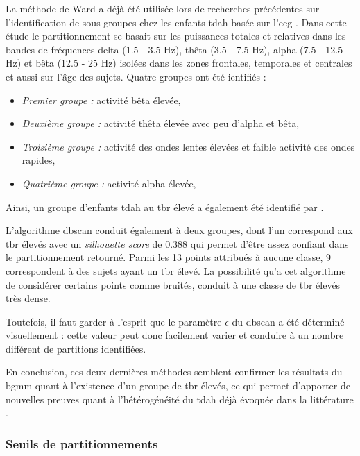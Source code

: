 La méthode de Ward a déjà été utilisée lors de recherches 
précédentes sur l'identification de sous-groupes chez les enfants \gls{tdah} basée sur l'\gls{eeg} \citep{Clarke2011}. Dans cette étude le partitionnement
se basait sur les puissances totales et relatives dans les bandes de fréquences delta (1.5 - 3.5 Hz), thêta (3.5 - 7.5 Hz), alpha (7.5 - 12.5 Hz) et bêta 
(12.5 - 25 Hz) isolées dans les zones frontales, temporales et centrales et aussi sur l'âge des sujets. Quatre groupes ont été ientifiés : 
\begin{itemize}
\item \emph{Premier groupe :} activité bêta élevée,
\item \emph{Deuxième groupe :} activité thêta élevée avec peu d'alpha et bêta,
\item \emph{Troisième groupe :} activité des ondes lentes élevées et faible activité des ondes rapides,
\item \emph{Quatrième groupe :} activité alpha élevée,
\end{itemize}

Ainsi, un groupe d'enfants \gls{tdah} au \gls{tbr} élevé a également été identifié par \citet{Clarke2011}.

L'algorithme \gls{dbscan} conduit également à deux groupes, dont l'un correspond aux \gls{tbr} élevés avec un \textit{silhouette score} de 0.388 
qui permet d'être assez confiant dans le partitionnement retourné. Parmi les 13 points attribués à 
aucune classe, 9 correspondent à des sujets ayant un \gls{tbr} élevé. La possibilité qu'a cet algorithme de considérer certains points comme bruités, conduit à
une classe de \gls{tbr} élevés très dense. 

Toutefois, il faut garder à l'esprit que le paramètre $\epsilon$ du \gls{dbscan} a été déterminé visuellement : cette valeur peut donc facilement varier et conduire à
un nombre différent de partitions identifiées. 

En conclusion, ces deux dernières méthodes semblent confirmer les résultats du \gls{bgmm} quant à l'existence d'un groupe de \gls{tbr} élevés, ce qui permet 
d'apporter de nouvelles preuves quant à l'hétérogénéité du \gls{tdah} déjà évoquée dans la littérature \citep{Arns2008, Arns2012, Barry2003, Clarke2011, 
Liechti2013, Loo2013, Loo2018}.

\subsubsection{Seuils de partitionnements}

